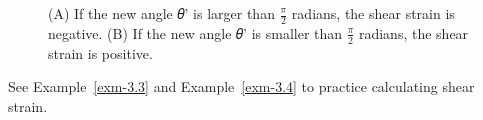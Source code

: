 \documentclass[
  letterpaper,
  DIV=11,
  numbers=noendperiod]{scrreprt}
\theoremstyle{definition}
\theoremstyle{remark}
\begin{document}
\begin{figure}


\caption{\label{fig-3.5}(A) If the new angle 𝜃' is larger than
\(\frac{\pi}{2}\) radians, the shear strain is negative. (B) If the new
angle 𝜃' is smaller than \(\frac{\pi}{2}\) radians, the shear strain is
positive.}

\end{figure}%

See Example~\ref{exm-3.3} and Example~\ref{exm-3.4} to practice
calculating shear strain.
\end{document}
